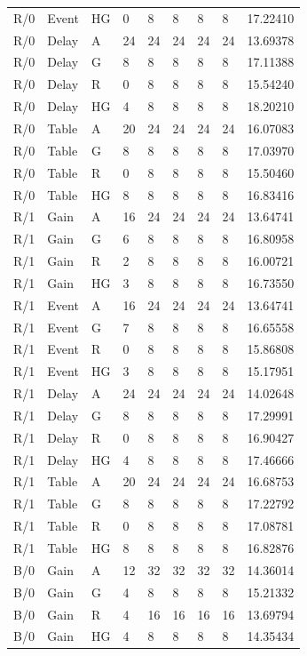 \begin{longtable}{lllllllll}
R/0 & Event & HG & 0 & 8 & 8 & 8 & 8 & 17.22410 \\
R/0 & Delay & A & 24 & 24 & 24 & 24 & 24 & 13.69378 \\
R/0 & Delay & G & 8 & 8 & 8 & 8 & 8 & 17.11388 \\
R/0 & Delay & R & 0 & 8 & 8 & 8 & 8 & 15.54240 \\
R/0 & Delay & HG & 4 & 8 & 8 & 8 & 8 & 18.20210 \\
R/0 & Table & A & 20 & 24 & 24 & 24 & 24 & 16.07083 \\
R/0 & Table & G & 8 & 8 & 8 & 8 & 8 & 17.03970 \\
R/0 & Table & R & 0 & 8 & 8 & 8 & 8 & 15.50460 \\
R/0 & Table & HG & 8 & 8 & 8 & 8 & 8 & 16.83416 \\
R/1 & Gain & A & 16 & 24 & 24 & 24 & 24 & 13.64741 \\
R/1 & Gain & G & 6 & 8 & 8 & 8 & 8 & 16.80958 \\
R/1 & Gain & R & 2 & 8 & 8 & 8 & 8 & 16.00721 \\
R/1 & Gain & HG & 3 & 8 & 8 & 8 & 8 & 16.73550 \\
R/1 & Event & A & 16 & 24 & 24 & 24 & 24 & 13.64741 \\
R/1 & Event & G & 7 & 8 & 8 & 8 & 8 & 16.65558 \\
R/1 & Event & R & 0 & 8 & 8 & 8 & 8 & 15.86808 \\
R/1 & Event & HG & 3 & 8 & 8 & 8 & 8 & 15.17951 \\
R/1 & Delay & A & 24 & 24 & 24 & 24 & 24 & 14.02648 \\
R/1 & Delay & G & 8 & 8 & 8 & 8 & 8 & 17.29991 \\
R/1 & Delay & R & 0 & 8 & 8 & 8 & 8 & 16.90427 \\
R/1 & Delay & HG & 4 & 8 & 8 & 8 & 8 & 17.46666 \\
R/1 & Table & A & 20 & 24 & 24 & 24 & 24 & 16.68753 \\
R/1 & Table & G & 8 & 8 & 8 & 8 & 8 & 17.22792 \\
R/1 & Table & R & 0 & 8 & 8 & 8 & 8 & 17.08781 \\
R/1 & Table & HG & 8 & 8 & 8 & 8 & 8 & 16.82876 \\
B/0 & Gain & A & 12 & 32 & 32 & 32 & 32 & 14.36014 \\
B/0 & Gain & G & 4 & 8 & 8 & 8 & 8 & 15.21332 \\
B/0 & Gain & R & 4 & 16 & 16 & 16 & 16 & 13.69794 \\
B/0 & Gain & HG & 4 & 8 & 8 & 8 & 8 & 14.35434 \\

\end{longtable}
